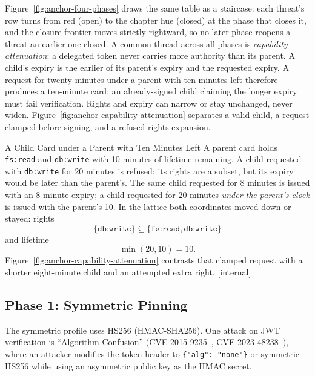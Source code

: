 \documentclass[11pt,a4paper]{article}
\theoremstyle{definition}
\begin{document}
Figure~\ref{fig:anchor-four-phases} draws the same table as a staircase: each
threat's row turns from red (open) to the chapter hue (closed) at the phase
that closes it, and the closure frontier moves strictly rightward, so no
later phase reopens a threat an earlier one closed.
A common thread across all phases is \emph{capability attenuation}: a delegated token never carries more authority than its parent. A child's expiry is the earlier of its parent's expiry and the requested expiry. A request for twenty minutes under a parent with ten minutes left therefore produces a ten-minute card; an already-signed child claiming the longer expiry must fail verification. Rights and expiry can narrow or stay unchanged, never widen. Figure~\ref{fig:anchor-capability-attenuation} separates a valid child, a request clamped before signing, and a refused rights expansion.
\begin{pdexample}{A Child Card under a Parent with Ten Minutes Left}
\setlength{\parskip}{4pt plus 1pt}
A parent card holds \texttt{fs:read} and \texttt{db:write} with 10 minutes of
lifetime remaining. A child requested with \texttt{db:write} for 20 minutes is
refused: its rights are a subset, but its expiry would be later than the parent's.
The same child requested for 8 minutes is issued with an 8-minute expiry; a child
requested for 20 minutes \emph{under the parent's clock} is issued with the
parent's 10.
In the lattice both coordinates moved down or stayed: rights
\[
\{\texttt{db:write}\} \subseteq \{\texttt{fs:read},\texttt{db:write}\}
\]
and
lifetime
\[
\min(20, 10) = 10.
\]
Figure~\ref{fig:anchor-capability-attenuation}
contrasts that clamped request with a shorter eight-minute child and an attempted extra right. [internal]
\end{pdexample}



\subsection{Phase 1: Symmetric Pinning}

The symmetric profile uses HS256 (HMAC-SHA256). One attack on JWT verification is ``Algorithm Confusion'' (CVE-2015-9235~, CVE-2023-48238~), where an attacker modifies the token header to \texttt{\{"alg": "none"\}} or symmetric HS256 while using an asymmetric public key as the HMAC secret.
\end{document}
